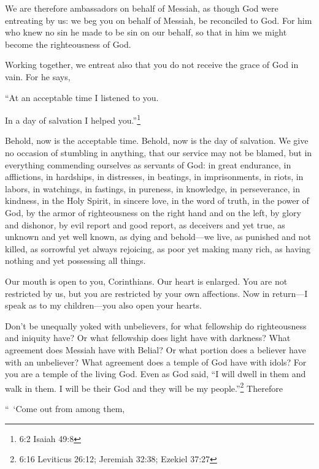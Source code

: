 \myverse{}We are therefore ambassadors on behalf of Messiah, as though
God were entreating by us: we beg you on behalf of Messiah, be reconciled to God.
\myverse{}For him who knew no sin he made to be sin on our behalf, so that in him we
might become the righteousness of God.


\mychapter{} \myverse*{}Working together, we entreat also that you do not receive the grace
of God in vain.
\myverse{}For he says,

\quad\quad “At an acceptable time I listened to you.

In a day of salvation I helped you.”\footnote{6:2 Isaiah 49:8}

Behold, now is the acceptable time. Behold, now is the day of salvation.
\myverse{}We give no occasion of stumbling in anything, that our service may not be blamed,
\myverse{}but in everything commending ourselves as servants of God: in great endurance,
in afflictions, in hardships, in distresses,
\myverse{}in beatings, in imprisonments, in riots, in labors, in watchings, in fastings,
\myverse{}in pureness, in knowledge, in perseverance, in kindness, in the Holy Spirit,
in sincere love,
\myverse{}in the word of truth, in the power of God, by the armor of righteousness on
the right hand and on the left,
\myverse{}by glory and dishonor, by evil report and good report, as deceivers and yet
true,
\myverse{}as unknown and yet well known, as dying and behold—we live, as punished and
not killed,
\myverse{}as sorrowful yet always rejoicing, as poor yet making many rich, as having
nothing and yet possessing all things.

\myverse{}Our mouth is open to you, Corinthians. Our heart is enlarged.
\myverse{}You are not restricted by us, but you are restricted by your own affections.
\myverse{}Now in return—I speak as to my children—you also open your hearts.

\myverse{}Don’t be unequally yoked with unbelievers, for what fellowship
do righteousness and iniquity have? Or what fellowship does light have with darkness?
\myverse{}What agreement does Messiah have with Belial? Or what portion does a believer
have with an unbeliever?
\myverse{}What agreement does a temple of God have with idols? For you are a temple
of the living God. Even as God said, “I will dwell in them and walk in them. I will be their God and they
will be my people.”\footnote{6:16 Leviticus 26:12;
	Jeremiah 32:38;
	Ezekiel 37:27}
\myverse{}Therefore

“ ‘Come out from among them,

